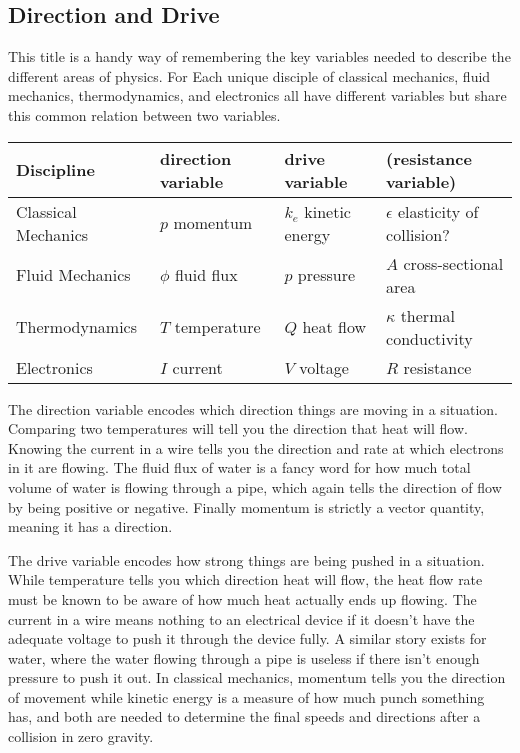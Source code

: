 \documentclass[a4paper]{article}
\begin{document}
\subsection{Direction and Drive}

This title is a handy way of remembering the key variables needed to describe the different areas of physics. For Each unique disciple of classical mechanics, fluid mechanics, thermodynamics, and electronics all have different variables but share this common relation between two variables. 

\vspace{0.2cm} \hspace{0.2cm}
\begin{tabular}{| l | l | l | l |}
\toprule
Discipline & direction variable & drive variable & (resistance variable) \\
\midrule
Classical Mechanics & $p$ momentum & $k_e$ kinetic energy & $\epsilon$ elasticity of collision? \\
Fluid Mechanics & $\phi$ fluid flux & $p$ pressure & $A$ cross-sectional area\\
Thermodynamics & $T$ temperature & $Q$ heat flow & $\kappa$ thermal conductivity \\
Electronics & $I$ current & $V$ voltage & $R$ resistance \\
\bottomrule
\end{tabular}
\vspace{0.2cm}

The direction variable encodes which direction things are moving in a situation. Comparing two temperatures will tell you the direction that heat will flow. Knowing the current in a wire tells you the direction and rate at which electrons in it are flowing. The fluid flux of water is a fancy word for how much total volume of water is flowing through a pipe, which again tells the direction of flow by being positive or negative. Finally momentum is strictly a vector quantity, meaning it has a direction.

The drive variable encodes how strong things are being pushed in a situation. While temperature tells you which direction heat will flow, the heat flow rate must be known to be aware of how much heat actually ends up flowing. The current in a wire means nothing to an electrical device if it doesn't have the adequate voltage to push it through the device fully. A similar story exists for water, where the water flowing through a pipe is useless if there isn't enough pressure to push it out. In classical mechanics, momentum tells you the direction of movement while kinetic energy is a measure of how much punch something has, and both are needed to determine the final speeds and directions after a collision in zero gravity. 
\end{document}
